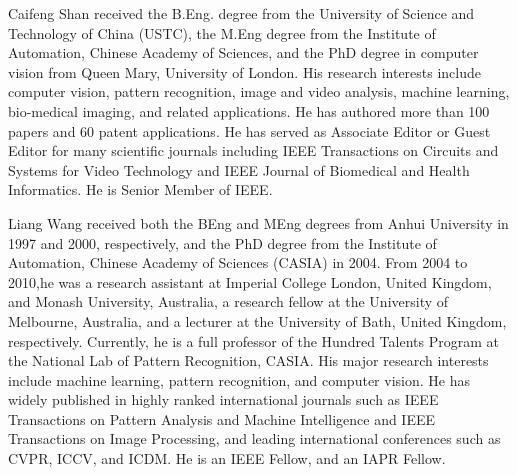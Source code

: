 \documentclass[journal]{IEEEtran}
\begin{document}
\begin{IEEEbiography}{Caifeng Shan}
received the B.Eng. degree from the University of Science and Technology of China (USTC), the M.Eng degree from the Institute of Automation, Chinese Academy of Sciences, and the PhD degree in computer vision from Queen Mary, University of London. His research interests include computer vision, pattern recognition, image and video analysis, machine learning, bio-medical imaging, and related applications. He has authored more than 100 papers and 60 patent applications. He has served as Associate Editor or Guest Editor for many scientific journals including IEEE Transactions on Circuits and Systems for Video Technology and IEEE Journal of Biomedical and Health Informatics. He is Senior Member of IEEE.
\end{IEEEbiography}

\begin{IEEEbiography}{Liang Wang}
received both the BEng and MEng degrees from Anhui University in 1997 and 2000, respectively, and the PhD degree from the Institute of Automation, Chinese Academy of Sciences (CASIA) in 2004. From 2004 to 2010,he was a research assistant at Imperial College London, United Kingdom, and Monash University, Australia, a research fellow at the University of Melbourne, Australia, and a lecturer at the University of Bath, United Kingdom, respectively. Currently, he is a full professor of the Hundred Talents Program at the National Lab of Pattern Recognition, CASIA. His major research interests include machine learning, pattern recognition, and computer vision. He has widely published in highly ranked international journals such as IEEE Transactions on Pattern Analysis and Machine Intelligence and IEEE Transactions on Image Processing, and leading international conferences such as CVPR, ICCV, and ICDM. He is an IEEE Fellow, and an IAPR Fellow.
\end{IEEEbiography}
\end{document}
